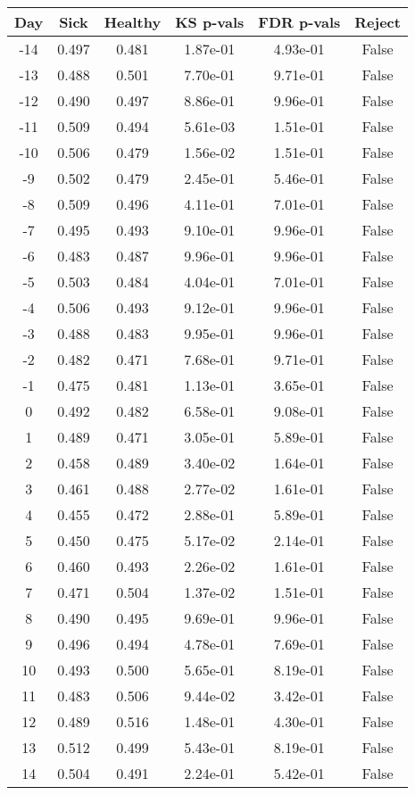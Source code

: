 \begin{tabular}{c|c|c|c|c|c}
Day &  Sick & Healthy &  KS p-vals & FDR p-vals & Reject\\
\hline
-14 & 0.497 &   0.481 &   1.87e-01 &   4.93e-01 &  False\\
-13 & 0.488 &   0.501 &   7.70e-01 &   9.71e-01 &  False\\
-12 & 0.490 &   0.497 &   8.86e-01 &   9.96e-01 &  False\\
-11 & 0.509 &   0.494 &   5.61e-03 &   1.51e-01 &  False\\
-10 & 0.506 &   0.479 &   1.56e-02 &   1.51e-01 &  False\\
 -9 & 0.502 &   0.479 &   2.45e-01 &   5.46e-01 &  False\\
 -8 & 0.509 &   0.496 &   4.11e-01 &   7.01e-01 &  False\\
 -7 & 0.495 &   0.493 &   9.10e-01 &   9.96e-01 &  False\\
 -6 & 0.483 &   0.487 &   9.96e-01 &   9.96e-01 &  False\\
 -5 & 0.503 &   0.484 &   4.04e-01 &   7.01e-01 &  False\\
 -4 & 0.506 &   0.493 &   9.12e-01 &   9.96e-01 &  False\\
 -3 & 0.488 &   0.483 &   9.95e-01 &   9.96e-01 &  False\\
 -2 & 0.482 &   0.471 &   7.68e-01 &   9.71e-01 &  False\\
 -1 & 0.475 &   0.481 &   1.13e-01 &   3.65e-01 &  False\\
  0 & 0.492 &   0.482 &   6.58e-01 &   9.08e-01 &  False\\
  1 & 0.489 &   0.471 &   3.05e-01 &   5.89e-01 &  False\\
  2 & 0.458 &   0.489 &   3.40e-02 &   1.64e-01 &  False\\
  3 & 0.461 &   0.488 &   2.77e-02 &   1.61e-01 &  False\\
  4 & 0.455 &   0.472 &   2.88e-01 &   5.89e-01 &  False\\
  5 & 0.450 &   0.475 &   5.17e-02 &   2.14e-01 &  False\\
  6 & 0.460 &   0.493 &   2.26e-02 &   1.61e-01 &  False\\
  7 & 0.471 &   0.504 &   1.37e-02 &   1.51e-01 &  False\\
  8 & 0.490 &   0.495 &   9.69e-01 &   9.96e-01 &  False\\
  9 & 0.496 &   0.494 &   4.78e-01 &   7.69e-01 &  False\\
 10 & 0.493 &   0.500 &   5.65e-01 &   8.19e-01 &  False\\
 11 & 0.483 &   0.506 &   9.44e-02 &   3.42e-01 &  False\\
 12 & 0.489 &   0.516 &   1.48e-01 &   4.30e-01 &  False\\
 13 & 0.512 &   0.499 &   5.43e-01 &   8.19e-01 &  False\\
 14 & 0.504 &   0.491 &   2.24e-01 &   5.42e-01 &  False\\
\end{tabular}